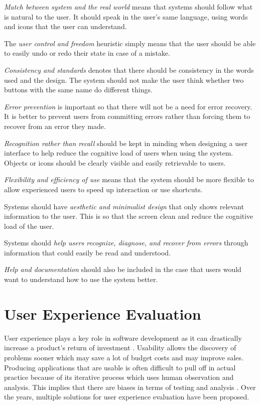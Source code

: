         \textit{Match between system and the real world} means that systems should follow what is natural to the user. It should speak in the user's same language, using words and icons that the user can understand. 
        
        The \textit{user control and freedom} heuristic simply means that the user should be able to easily undo or redo their state in case of a mistake. 
        
        \textit{Consistency and standards} denotes that there should be consistency in the words used and the design. The system should not make the user think whether two buttons with the same name do different things.
        
        \textit{Error prevention} is important so that there will not be a need for error recovery. It is better to prevent users from committing errors rather than forcing them to recover from an error they made.
        
        \textit{Recognition rather than recall} should be kept in minding when designing a user interface to help reduce the cognitive load of users when using the system. Objects or icons should be clearly visible and easily retrievable to users.
        
        \textit{Flexibility and efficiency of use} means that the system should be more flexible to allow experienced users to speed up interaction or use shortcuts. 
        
        Systems should have \textit{aesthetic and minimalist design} that only shows relevant information to the user. This is so that the screen clean and reduce the cognitive load of the user. 
        
        Systems should \textit{help users recognize, diagnose, and recover from errors} through information that could easily be read and understood.
        
        \textit{Help and documentation} should also be included in the case that users would want to understand how to use the system better.
    

\section{User Experience Evaluation}

		User experience plays a key role in software development as it can drastically increase a product's return of investment \citep{bellamy2011deploying}. Usability allows the discovery of problems sooner which may save a lot of budget costs and may improve sales. Producing applications that are usable is often difficult to pull off in actual practice because of its iterative process which uses human observation and analysis. This implies that there are biases in terms of testing and analysis \citep{bellamy2011deploying}. Over the years, multiple solutions for user experience evaluation have been proposed.


